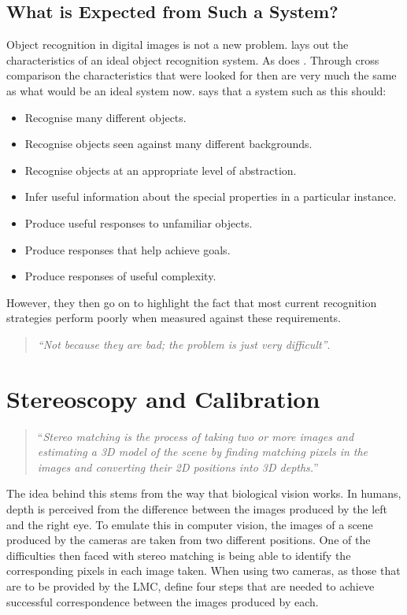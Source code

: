 \documentclass[11pt,oneside]{report}
\begin{document}
				\subsection{What is Expected from Such a System?}
				Object recognition in digital images is not a new problem.
				 lays out the characteristics of an ideal object recognition system.
				As does .
				Through cross comparison the characteristics that were looked for then are very much the same as what would be an ideal system now.
				 says that a system such as this should:
				\begin{itemize}
					\item Recognise many different objects.
					\item Recognise objects seen against many different backgrounds.
					\item Recognise objects at an appropriate level of abstraction.
					\item Infer useful information about the special properties in a particular instance.
					\item Produce useful responses to unfamiliar objects.
					\item Produce responses that help achieve goals.
					\item Produce responses of useful complexity.
				\end{itemize}
				However, they then go on to highlight the fact that most current recognition strategies perform poorly when measured against these requirements.
				\begin{quotation}
					\textit{``Not because they are bad; the problem is just very difficult''}.
				\end{quotation}
				
			\section{Stereoscopy and Calibration}
			\begin{quote}
				``\textit{Stereo matching is the process of taking two or more images and estimating a 3D model of the scene by finding matching pixels in the images and converting their 2D positions into 3D depths.}''\cite{book:sam}
			\end{quote}
			The idea behind this stems from the way that biological vision works.
			In humans, depth is perceived from the difference between the images produced by the left and the right eye.
			To emulate this in computer vision, the images of a scene produced by the cameras are taken from two different positions.
			One of the difficulties then faced with stereo matching is being able to identify the corresponding pixels in each image taken.
			When using two cameras, as those that are to be provided by the LMC,  define four steps that are needed to achieve successful correspondence between the images produced by each.
			
\end{document}
